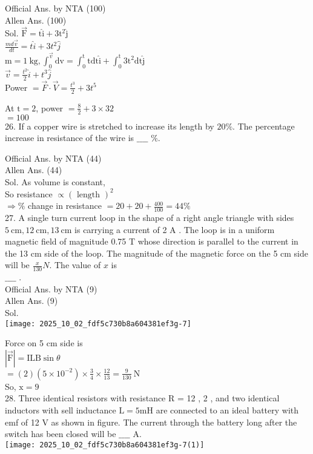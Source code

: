 \documentclass[10pt]{article}
\begin{document}
Official Ans. by NTA (100)\\
Allen Ans. (100)\\
Sol. \(\overrightarrow{\mathrm{F}}=\mathrm{t} \hat{\mathrm{i}}+3 \mathrm{t}^{2} \hat{\mathrm{j}}\)\\
\(\frac{m d \vec{v}}{d t}=t \hat{i}+3 t^{2} \hat{j}\)\\
\(\mathrm{m}=1 \mathrm{~kg}, \int_{0}^{\vec{v}} \mathrm{dv}=\int_{0}^{\mathrm{t}} \mathrm{tdt} \hat{\mathrm{i}}+\int_{0}^{\mathrm{t}} 3 \mathrm{t}^{2} \mathrm{dt} \hat{\mathrm{j}}\)\\
\(\vec{v}=\frac{t^{2}}{2} \hat{i}+t^{3} \hat{j}\)\\
Power \(=\vec{F} \cdot \vec{V}=\frac{t^{3}}{2}+3 t^{5}\)

At \(\mathrm{t}=2\), power \(=\frac{8}{2}+3 \times 32\)\\
\(=100\)\\
26. If a copper wire is stretched to increase its length by \(20 \%\). The percentage increase in resistance of the wire is \(\_\_\_\_\) \(\%\).

Official Ans. by NTA (44)\\
Allen Ans. (44)\\
Sol. As volume is constant,\\
So resistance \(\propto(\text { length })^{2}\)\\
\(\Rightarrow \%\) change in resistance \(=20+20+\frac{400}{100}=44 \%\)\\
27. A single turn current loop in the shape of a right angle triangle with sides \(5 \mathrm{~cm}, 12 \mathrm{~cm}, 13 \mathrm{~cm}\) is carrying a current of 2 A . The loop is in a uniform magnetic field of magnitude 0.75 T whose direction is parallel to the current in the 13 cm side of the loop. The magnitude of the magnetic force on the 5 cm side will be \(\frac{x}{130} N\). The value of \(x\) is\\
\(\_\_\_\_\) .\\
Official Ans. by NTA (9)\\
Allen Ans. (9)\\
Sol.\\
\texttt{[image: 2025\_10\_02\_fdf5c730b8a604381ef3g-7]}

Force on 5 cm side is\\
\(|\overrightarrow{\mathrm{F}}|=\mathrm{ILB} \sin \theta\)\\
\(=(2)\left(5 \times 10^{-2}\right) \times \frac{3}{4} \times \frac{12}{13}=\frac{9}{130} \mathrm{~N}\)\\
So, \(\mathrm{x}=9\)\\
28. Three identical resistors with resistance R = 12 , 2 , and two identical inductors with sell inductance \(\mathrm{L}=5 \mathrm{mH}\) are connected to an ideal battery with emf of 12 V as shown in figure. The current through the battery long after the switch has been closed will be \(\_\_\_\_\) A.\\
\texttt{[image: 2025\_10\_02\_fdf5c730b8a604381ef3g-7(1)]}
\end{document}
